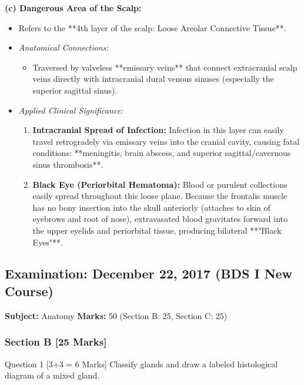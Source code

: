 \documentclass[11pt,a4paper]{article}
\begin{document}
\begin{ansbox}
\textbf{(c) Dangerous Area of the Scalp:}
\begin{itemize}[leftmargin=*]
    \item Refers to the **4th layer of the scalp: Loose Areolar Connective Tissue**.
    \item \textit{Anatomical Connections:}
    \begin{itemize}
        \item Traversed by valveless **emissary veins** that connect extracranial scalp veins directly with intracranial dural venous sinuses (especially the superior sagittal sinus).
    \end{itemize}
    \item \textit{Applied Clinical Significance:}
    \begin{enumerate}
        \item \textbf{Intracranial Spread of Infection:} Infection in this layer can easily travel retrogradely via emissary veins into the cranial cavity, causing fatal conditions: **meningitis, brain abscess, and superior sagittal/cavernous sinus thrombosis**.
        \item \textbf{Black Eye (Periorbital Hematoma):} Blood or purulent collections easily spread throughout this loose plane. Because the frontalis muscle has no bony insertion into the skull anteriorly (attaches to skin of eyebrows and root of nose), extravasated blood gravitates forward into the upper eyelids and periorbital tissue, producing bilateral **"Black Eyes"**.
    \end{enumerate}
\end{itemize}
\end{ansbox}

\newpage
\subsection{Examination: December 22, 2017 (BDS I New Course)}
\textbf{Subject:} Anatomy \quad \textbf{Marks:} 50 (Section B: 25, Section C: 25)

\subsubsection{Section B [25 Marks]}

\begin{qbox}{Question 1 [3+3 = 6 Marks]}
Classify glands and draw a labeled histological diagram of a mixed gland.
\end{qbox}
\end{document}
